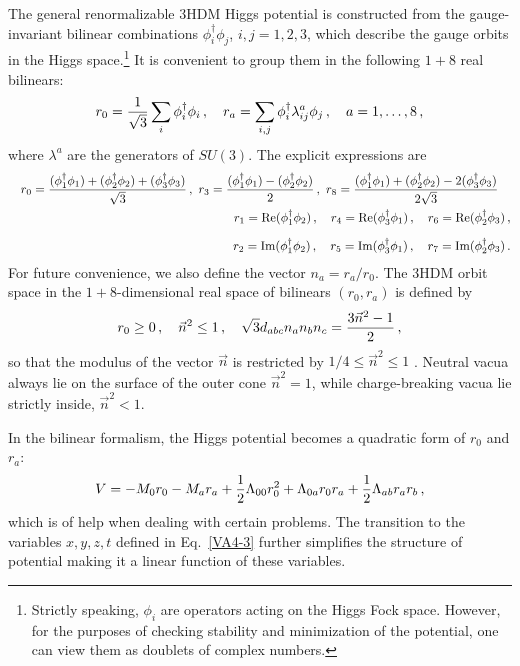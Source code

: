 \documentclass[11pt]{article}
\renewcommand{\Re}{\mathrm{Re }}
\renewcommand{\Im}{\mathrm{Im }}
\begin{document}
The general renormalizable 3HDM Higgs potential is constructed from the gauge-invariant
bilinear combinations $\phi_i^\dagger \phi_j$, $i, j = 1,2,3$, which describe the gauge orbits in the Higgs space.\footnote{Strictly speaking, 
$\phi_i$ are operators acting on the Higgs Fock space.
However, for the purposes of checking stability and minimization of the potential,
one can view them as doublets of complex numbers.} 
It is convenient to group them in the following $1+8$ real bilinears:
\begin{equation}
r_0 = {1\over \sqrt{3}}\sum_i \phi_i^\dagger \phi_i\,,\quad r_a = \sum_{i,j} \phi_i^\dagger \lambda^a_{ij}\phi_j\,,
\quad a = 1, \dots, 8\,,
\label{rmu}
\end{equation}
where $\lambda^a$ are the generators of $SU(3)$.
The explicit expressions are
\begin{eqnarray}
&& r_0 = {(\phi_1^\dagger\phi_1) + (\phi_2^\dagger\phi_2) + (\phi_3^\dagger\phi_3)\over\sqrt{3}}\,,\ 
r_3 = {(\phi_1^\dagger\phi_1) - (\phi_2^\dagger\phi_2) \over 2}\,,\ 
r_8 = {(\phi_1^\dagger\phi_1) + (\phi_2^\dagger\phi_2) - 2(\phi_3^\dagger\phi_3) \over 2\sqrt{3}} \quad
\nonumber\\
&&r_1 = \Re(\phi_1^\dagger\phi_2)\,,\quad 
r_4 = \Re(\phi_3^\dagger\phi_1)\,,\quad 
r_6 = \Re(\phi_2^\dagger\phi_3)\,,\nonumber\\[2mm] 
&&r_2 = \Im(\phi_1^\dagger\phi_2)\,,\quad
r_5 = \Im(\phi_3^\dagger\phi_1)\,,\quad
r_7 = \Im(\phi_2^\dagger\phi_3)\,. \label{ri3HDM}
\end{eqnarray}
For future convenience, we also define the vector $n_a = r_a/r_0$.
The 3HDM orbit space in the $1+8$-dimensional real space of bilinears $(r_0,r_a)$ is defined by
\begin{equation}
r_0 \ge 0\,,\quad \vec n^2 \le 1\,,\quad \sqrt{3}d_{abc} n_a n_b n_c = {3 \vec n^2 - 1\over 2}\,,
\label{3HDMconditions}
\end{equation}
so that the modulus of the vector $\vec n$ is restricted by $1/4 \le \vec n^2 \le 1$ \cite{Ivanov:2010ww}.
Neutral vacua always lie on the surface of the outer cone $\vec n^2 = 1$,
while charge-breaking vacua lie strictly inside, $\vec n^2 < 1$. 

In the bilinear formalism, the Higgs potential becomes a quadratic form of $r_0$ and $r_a$:
\begin{equation}
\label{potential}
V = - M_0 r_0 - M_a r_a + {1 \over 2}\Lambda_{00} r_0^2 + \Lambda_{0a} r_0 r_a + {1 \over 2}\Lambda_{ab} r_a r_b\,,
\end{equation}
which is of help when dealing with certain problems.
The transition to the variables $x, y, z, t$ defined in Eq.~\eqref{VA4-3} further simplifies the structure of potential
making it a linear function of these variables.
\end{document}
